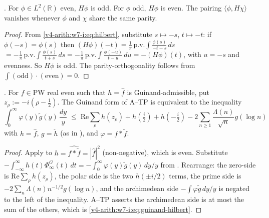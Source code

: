 \begin{lemma}
\label{v4-arith:w7-i:lem:hilbert-even}
\ClaimStatusProvedHere. For \(\phi\in L^{2}(\mathbb{R})\) even, \(H\phi\)
is odd. For \(\phi\) odd, \(H\phi\) is even. The pairing
\(\langle\phi, H\chi\rangle\) vanishes whenever \(\phi\) and \(\chi\)
share the same parity.
\end{lemma}

\begin{proof}
From \eqref{v4-arith:w7-i:eq:hilbert}, substitute \(s\mapsto-s\),
\(t\mapsto-t\): if \(\phi(-s)=\phi(s)\) then
\((H\phi)(-t)=\frac{1}{\pi}\,\mathrm{p.v.}\int\frac{\phi(s)}{-t-s}\,ds\)
\(=-\frac{1}{\pi}\,\mathrm{p.v.}\int\frac{\phi(s)}{t+s}\,ds
=-\frac{1}{\pi}\,\mathrm{p.v.}\int\frac{\phi(-u)}{t-u}\,du=-(H\phi)(t)\),
with \(u=-s\) and evenness. So \(H\phi\) is odd. The parity-orthogonality
follows from \(\int(\text{odd})\cdot(\text{even})=0\).
\end{proof}

\begin{proposition}
\label{v4-arith:w7-i:prop:guinand-as-hilbert}
\ClaimStatusProvedHere. For \(f\in\mathrm{PW}\) real even such that
\(h=\widehat f\) is Guinand-admissible, put
\(z_{\rho}:=-i(\rho-\tfrac12)\). The Guinand form of A--TP is
equivalent to the inequality
\begin{equation}
\label{v4-arith:w7-i:eq:guinand-hilbert}
\int_{0}^{\infty}\varphi(y)\widetilde g(y)\,\frac{dy}{y}
\;\leq\;\mathrm{Re}\sum_{\rho}h(z_{\rho})
+h(\tfrac{i}{2})+h(-\tfrac{i}{2})-2\sum_{n\geq 1}\frac{\Lambda(n)}{\sqrt n}g(\log n)
\end{equation}
with \(h=\widehat f\), \(g=\check h\) (as in
), and \(\varphi=f\ast\widetilde f\).
\end{proposition}

\begin{proof}
Apply  to
\(h=\widehat{f\ast\widetilde f}=|\widehat f|^{2}\) (non-negative), which
is even. Substitute
\(-\int_{-\infty}^{\infty}h(t)\Phi_{\infty}^{G}(t)\,dt
=-\int_{0}^{\infty}\varphi(y)\widetilde g(y)\,dy/y\) from
. Rearrange: the zero-side is
\(\mathrm{Re}\sum_{\rho}h(z_{\rho})\), the polar side is the two
\(h(\pm i/2)\) terms, the prime side is
\(-2\sum_{n}\Lambda(n)n^{-1/2}g(\log n)\), and the archimedean side
\(-\int\varphi\widetilde g\,dy/y\) is negated to the left of the
inequality. A--TP asserts the archimedean side is at most the sum of
the others, which is \eqref{v4-arith:w7-i:eq:guinand-hilbert}.
\end{proof}


